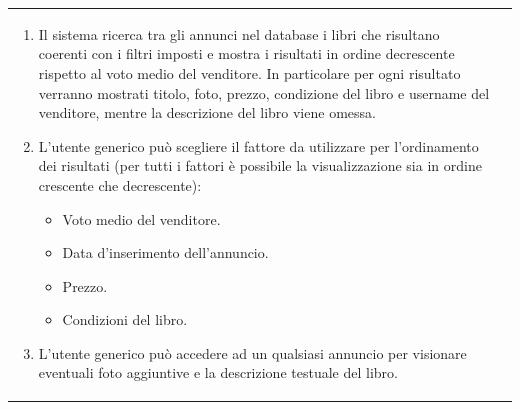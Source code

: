 \documentclass[10pt,a4paper]{report}
\begin{document}
\begin{tabular}{lp{}}
\begin{enumerate}
\begin{itemize}
			\end{itemize}
			\item Il sistema ricerca tra gli annunci nel database i libri che risultano coerenti con i filtri imposti e mostra i risultati in ordine decrescente rispetto al voto medio del venditore. In particolare per ogni risultato verranno mostrati titolo, foto, prezzo, condizione del libro e username del venditore, mentre la descrizione del libro viene omessa.
			\item L'utente generico può scegliere il fattore da utilizzare per l'ordinamento dei risultati (per tutti i fattori è possibile la visualizzazione sia in ordine crescente che decrescente):
			\begin{itemize}
				\item Voto medio del venditore.
				\item Data d'inserimento dell'annuncio.
				\item Prezzo.
				\item Condizioni del libro.
			\end{itemize}
			\item L'utente generico può accedere ad un qualsiasi annuncio per visionare eventuali foto aggiuntive e la descrizione testuale del libro.
		\end{enumerate}
	\end{tabular}
\end{document}
